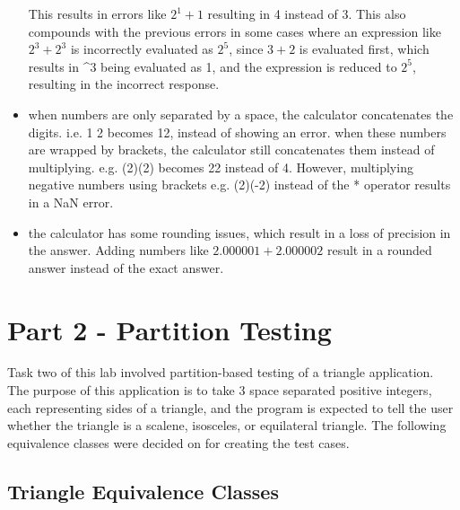 \documentclass[letterpaper]{article}
\begin{document}
\begin{itemize}
          This results in errors like $2^1+1$ resulting in 4 instead of 3.
          This also compounds with the previous errors in some cases where an expression like $2^3 + 2^3$
          is incorrectly evaluated as $2^5$, since $3+2$ is evaluated first, which results in 
          \textasciicircum 3
          being evaluated as 1, and the expression is reduced to $2^{5}$, resulting in the incorrect response.
    \item when numbers are only separated by a space, the calculator concatenates the digits. i.e. 1 2 becomes 12, instead of showing an error.
          when these numbers are wrapped by brackets, the calculator still concatenates them instead of multiplying. e.g. (2)(2) becomes 22 instead of 4.
          However, multiplying negative numbers using brackets e.g. (2)(-2) instead of the * operator results in a NaN error.
    \item the calculator has some rounding issues, which result in a loss of precision in the answer. Adding numbers like $2.000001+2.000002$ result in a rounded
          answer instead of the exact answer.
\end{itemize}

\section*{Part 2 - Partition Testing}
Task two of this lab involved partition-based testing of a triangle application.
The purpose of this application is to take 3 space separated positive integers,
each representing sides of a triangle, and the program is expected to tell the
user whether the triangle is a scalene, isosceles, or equilateral triangle.
The following equivalence classes were decided on for creating the test cases.
\subsection*{Triangle Equivalence Classes}
\end{document}
